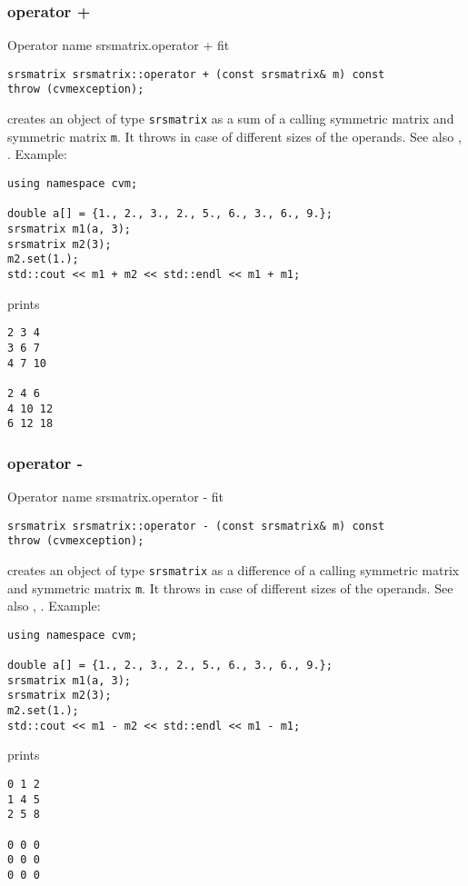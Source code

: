 \subsubsection{operator +}
Operator%
\pdfdest name {srsmatrix.operator +} fit
\begin{verbatim}
srsmatrix srsmatrix::operator + (const srsmatrix& m) const
throw (cvmexception);
\end{verbatim}
creates an object of type \verb"srsmatrix" as a sum of
a calling symmetric matrix and symmetric matrix \verb"m".
It throws  
in case of different sizes of the operands.
See also , .
Example:
\begin{Verbatim}
using namespace cvm;

double a[] = {1., 2., 3., 2., 5., 6., 3., 6., 9.};
srsmatrix m1(a, 3);
srsmatrix m2(3);
m2.set(1.);
std::cout << m1 + m2 << std::endl << m1 + m1;
\end{Verbatim}
prints
\begin{Verbatim}
2 3 4
3 6 7
4 7 10

2 4 6
4 10 12
6 12 18
\end{Verbatim}
\newpage




\subsubsection{operator -}
Operator%
\pdfdest name {srsmatrix.operator -} fit
\begin{verbatim}
srsmatrix srsmatrix::operator - (const srsmatrix& m) const
throw (cvmexception);
\end{verbatim}
creates an object of type \verb"srsmatrix" as a difference of
a calling symmetric matrix and symmetric matrix \verb"m".
It throws  
in case of different sizes of the operands.
See also , .
Example:
\begin{Verbatim}
using namespace cvm;

double a[] = {1., 2., 3., 2., 5., 6., 3., 6., 9.};
srsmatrix m1(a, 3);
srsmatrix m2(3);
m2.set(1.);
std::cout << m1 - m2 << std::endl << m1 - m1;
\end{Verbatim}
prints
\begin{Verbatim}
0 1 2
1 4 5
2 5 8

0 0 0
0 0 0
0 0 0
\end{Verbatim}
\newpage



